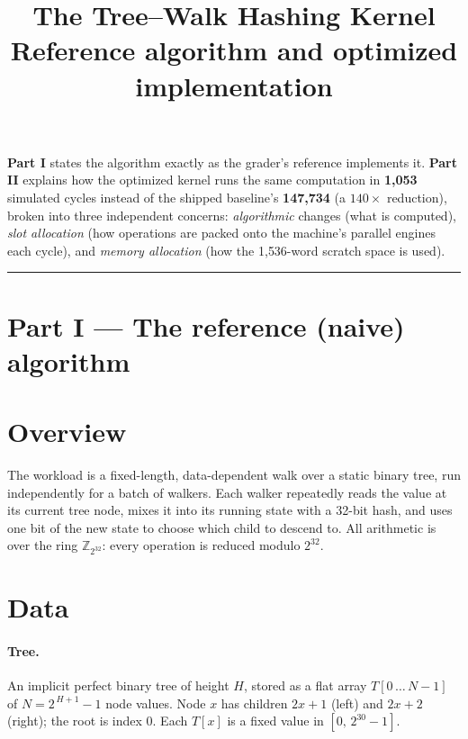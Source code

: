 \documentclass[11pt]{article}
\title{\vspace{-1.5em}The Tree--Walk Hashing Kernel\\[0.3em]
       \large Reference algorithm and optimized implementation}
\author{}
\date{}
\newcommand{\Z}{\mathbb{Z}}
\begin{document}
\maketitle
\vspace{-3em}

\noindent\textbf{Part I} states the algorithm exactly as the grader's
reference implements it. \textbf{Part II} explains how the optimized kernel
runs the same computation in \textbf{1{,}053} simulated cycles instead of the
shipped baseline's \textbf{147{,}734} (a $140\times$ reduction), broken into
three independent concerns: \emph{algorithmic} changes (what is computed),
\emph{slot allocation} (how operations are packed onto the machine's
parallel engines each cycle), and \emph{memory allocation} (how the
1{,}536-word scratch space is used).

\begin{center}\rule{0.4\linewidth}{0.4pt}\end{center}
\section*{\centering Part I --- The reference (naive) algorithm}

\section{Overview}

The workload is a fixed-length, data-dependent walk over a static binary
tree, run independently for a batch of walkers. Each walker repeatedly reads
the value at its current tree node, mixes it into its running state with a
32-bit hash, and uses one bit of the new state to choose which child to
descend to. All arithmetic is over the ring $\Z_{2^{32}}$: every operation is
reduced modulo $2^{32}$.

\section{Data}

\paragraph{Tree.} An implicit perfect binary tree of height $H$, stored as a
flat array $T[0\,\dots\,N-1]$ of $N = 2^{\,H+1}-1$ node values. Node $x$ has
children $2x+1$ (left) and $2x+2$ (right); the root is index $0$. Each
$T[x]$ is a fixed value in $[0,\,2^{30}-1]$.
\end{document}
